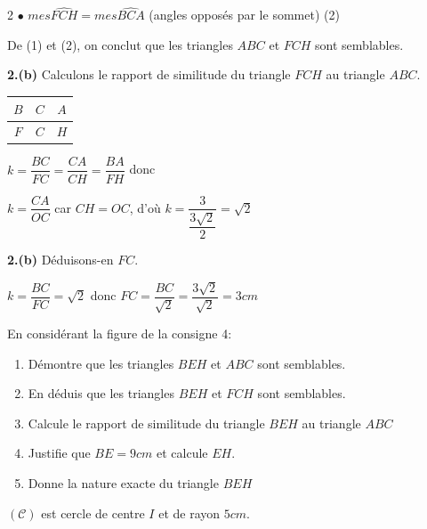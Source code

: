 \begin{multicols*}{2}
  	$\bullet$ 	$mes\widehat{FCH}=mes\widehat{BCA}$ (angles opposés par le sommet) (2)
  	
  	De (1) et (2), on conclut que les triangles $ABC$ et $FCH$ sont semblables. 
  	
  	\textbf{2.(b)} Calculons le rapport de similitude du triangle $FCH$ au triangle $ABC$.
  	
  	\begin{tabular}{|c|c|c|}
  		\hline
  		$B$&  $C$& $A$ \\
  		\hline
  		$F$&$C$  & $H$ \\
  		\hline
  	\end{tabular}
  	$k=\dfrac{BC}{FC}=\dfrac{CA}{CH}=\dfrac{BA}{FH}$ donc \vspace{0.2cm}
  	
  	$k=\dfrac{CA}{OC}$ car $CH=OC$, d'où $k=\dfrac{3}{\dfrac{3\sqrt{2}}{2}}=\sqrt{2}$
  	
  	\textbf{2.(b)} Déduisons-en $FC$.
  	
  	$k=\dfrac{BC}{FC}=\sqrt{2}$ donc $FC=\dfrac{BC}{\sqrt{2}}=\dfrac{3\sqrt{2}}{\sqrt{2}}=3 cm$
  	
  	\reto
  	\begin{center}
  	\end{center}
  	\begin{center}
  	\end{center}
  	En considérant la figure de la consigne 4: 
  	\begin{enumerate}
  		\item  Démontre que les triangles $BEH$ et $ABC$ sont semblables.
  		\item En déduis que  les triangles $BEH$ et $FCH$ sont semblables.
  		\item  Calcule le rapport de similitude du triangle $BEH$ au triangle $ABC$
  		\item Justifie que $BE=9 cm$ et calcule $EH$.
  		\item Donne la nature exacte du triangle $BEH$
  	\end{enumerate}
  	
  	\begin{center}
  	\end{center}
  	$\mathcal{(C)}$ est cercle de centre $I$ et de rayon $5cm$.
  	

\end{multicols*}
